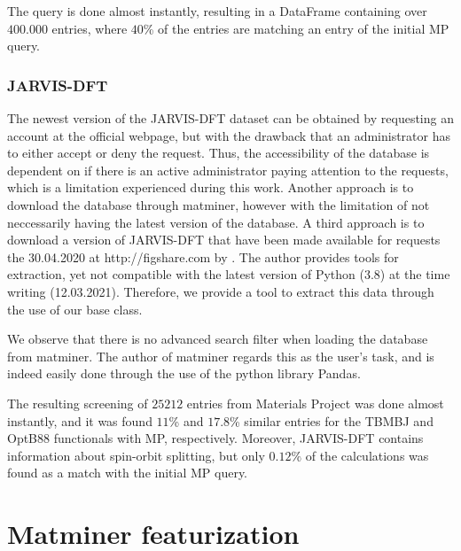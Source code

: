 The query is done almost instantly, resulting in a DataFrame containing over $400.000$ entries, where $40$\% of the entries are matching an entry of the initial MP query.

\subsubsection{JARVIS-DFT}

The newest version of the JARVIS-DFT dataset can be obtained by requesting an account at the official webpage, but with the drawback that an administrator has to either accept or deny the request. Thus, the accessibility of the database is dependent on if there is an active administrator paying attention to the requests, which is a limitation experienced during this work. Another approach is to download the database through matminer, however with the limitation of not neccessarily having the latest version of the database. A third approach is to download a version of JARVIS-DFT that have been made available for requests the 30.04.2020 at http://figshare.com by \citeauthor{Choudhary2020} \cite{Choudhary2020}. The author provides tools for extraction, yet not compatible with the latest version of Python (3.8) at the time writing (12.03.2021). Therefore, we provide a tool to extract this data through the use of our base class.



We observe that there is no advanced search filter when loading the database from matminer. The author of matminer regards this as the user's task, and is indeed easily done through the use of the python library Pandas.

The resulting screening of $25212$ entries from Materials Project was done almost instantly, and it was found $11$\% and $17.8$\% similar entries for the TBMBJ and OptB88 functionals with MP, respectively. Moreover, JARVIS-DFT contains information about spin-orbit splitting, but only $0.12\%$ of the calculations was found as a match with the initial MP query.

\section{Matminer featurization}

